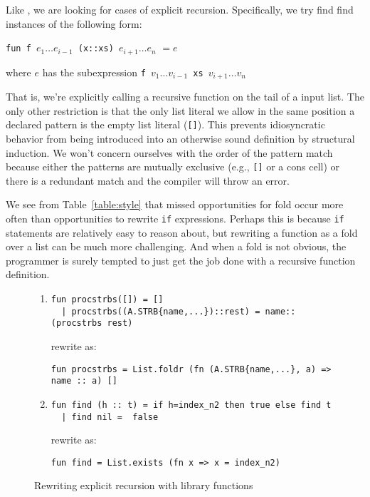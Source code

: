 \documentclass[12pt,abstracton]{scrartcl}
\begin{document}
Like \cite{Jeu13}, we are looking for cases of explicit recursion. Specifically, we try find
find instances of the following form:
\begin{center}
\texttt{fun f }\(e_{1}\ldots e_{i-1}\)\texttt{ (x::xs) }\(e_{i+1}\ldots e_{n}\) \(= e\)

where $e$ has the subexpression \texttt{f }\(v_{1}\ldots v_{i-1}\)\texttt{ xs }\(v_{i+1}\ldots v_{n}\)
\end{center}
That is, we're explicitly calling a recursive function on the tail of a input list.
The only other restriction is that the only list literal we allow in the same position
a declared pattern is the empty list literal (\texttt{[]}). This prevents idiosyncratic
behavior from being introduced into an otherwise sound definition by structural induction.
We won't concern ourselves with the order of the pattern match because either the patterns
are mutually exclusive (e.g., \texttt{[]} or a cons cell) or there is a redundant match
and the compiler will throw an error.

We see from Table~\ref{table:style} that missed opportunities for fold occur more often
than opportunities to rewrite \texttt{if} expressions. Perhaps this is
because \texttt{if} statements are relatively easy to reason about, but
rewriting a function as a fold over a list can be much more challenging.
And when a fold is not obvious, the programmer is surely tempted to just
get the job done with a recursive function definition.

\begin{figure}[h!]
\begin{enumerate}
\item \begin{verbatim}
fun procstrbs([]) = []
  | procstrbs((A.STRB{name,...})::rest) = name::(procstrbs rest)
\end{verbatim}

rewrite as:
\begin{verbatim}
fun procstrbs = List.foldr (fn (A.STRB{name,...}, a) => name :: a) []
\end{verbatim}
\item \begin{verbatim}
fun find (h :: t) = if h=index_n2 then true else find t
  | find nil =  false
\end{verbatim}

rewrite as:
\begin{verbatim}
fun find = List.exists (fn x => x = index_n2)
\end{verbatim}
\end{enumerate}
\caption{Rewriting explicit recursion with library functions}
\label{figure:fold}
\end{figure}
\end{document}
